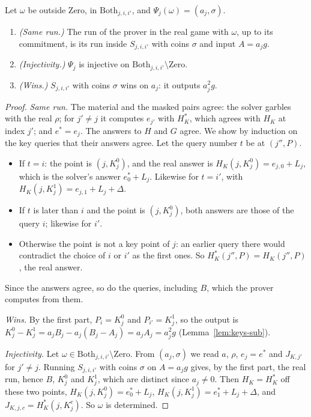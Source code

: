 \begin{lemma}
  \label{lem:co-sqdh}
  \leanok
  Let $\omega$ be outside $\mathrm{Zero}$, in $\mathrm{Both}_{j,i,i'}$, and $\Psi_j(\omega) = (a_j,
  \sigma)$.
  \begin{enumerate}
    \item \emph{(Same run.)} The run of the prover in the real game with $\omega$, up to its
    commitment, is its run inside $S_{j,i,i'}$ with coins $\sigma$ and input $A = a_j g$.
    \item \emph{(Injectivity.)} $\Psi_j$ is injective on $\mathrm{Both}_{j,i,i'} \setminus
    \mathrm{Zero}$.
    \item \emph{(Wins.)} $S_{j,i,i'}$ with coins $\sigma$ wins on $a_j$: it outputs $a_j^2 g$.
  \end{enumerate}
\end{lemma}

\begin{proof}
  \leanok
  \emph{Same run.} The material and the masked pairs agree: the solver garbles with the real
  $\rho$; for $j' \neq j$ it computes $e_{j'}$ with $H_K^*$, which agrees with $H_K$ at index $j'$;
  and $e^* = e_j$. The answers to $H$ and $G$ agree. We show by induction on the key queries that
  their answers agree. Let the query number $t$ be at $(j'', P)$.
  \begin{itemize}
    \item If $t = i$: the point is $(j, K^0_j)$, and the real answer is $H_K(j, K^0_j) = e_{j,0} +
    L_j$, which is the solver's answer $e^*_0 + L_j$. Likewise for $t = i'$, with $H_K(j, K^1_j) =
    e_{j,1} + L_j + \Delta$.
    \item If $t$ is later than $i$ and the point is $(j, K^0_j)$, both answers are those of the query
    $i$; likewise for $i'$.
    \item Otherwise the point is not a key point of $j$: an earlier query there would contradict
    the choice of $i$ or $i'$ as the first ones. So $H_K^*(j'', P) = H_K(j'', P)$, the real answer.
  \end{itemize}
  Since the answers agree, so do the queries, including $B$, which the prover computes from them.

  \emph{Wins.} By the first part, $P_i = K^0_j$ and $P_{i'} = K^1_j$, so the output is $K^0_j -
  K^1_j = a_j B_j - a_j(B_j - A_j) = a_j A_j = a_j^2 g$ (Lemma~\ref{lem:keys-sub}).

  \emph{Injectivity.} Let $\omega \in \mathrm{Both}_{j,i,i'} \setminus \mathrm{Zero}$. From $(a_j, \sigma)$ we read $a$, $\rho$, $e_j = e^*$ and $J_{K,j'}$ for $j'
  \neq j$. Running $S_{j,i,i'}$ with coins $\sigma$ on $A = a_j g$ gives, by the first part, the
  real run, hence $B$, $K^0_j$ and $K^1_j$, which are distinct since $a_j \neq 0$. Then $H_K = H_K^*$ off these two points,
  $H_K(j, K^0_j) = e^*_0 + L_j$, $H_K(j, K^1_j) = e^*_1 + L_j + \Delta$, and $J_{K,j,c} = H_K^*(j,
  K^c_j)$. So $\omega$ is determined.
\end{proof}

